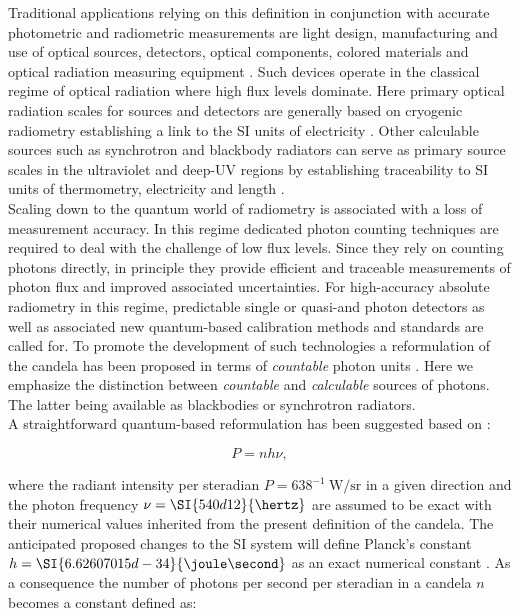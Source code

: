 		Traditional applications relying on this definition in conjunction with accurate photometric and radiometric measurements are light design, manufacturing and use of optical sources, detectors, optical components, colored materials and optical radiation measuring equipment \cite{zwinkels2010photometry}.
		Such devices operate in the classical regime of optical radiation where high flux levels dominate. Here primary optical radiation scales for sources and detectors are generally based on cryogenic radiometry establishing a link to the SI units of electricity \cite{fox20052}. Other calculable sources such as synchrotron and blackbody radiators can serve as primary source scales in the ultraviolet and deep-UV regions by establishing traceability to SI units of thermometry, electricity and length \cite{zwinkels2010photometry, Cheung2007}.
		\\
		Scaling down to the quantum world of radiometry is associated with a loss of measurement accuracy. In this regime dedicated photon counting techniques are required to deal with the challenge of low flux levels. Since they rely on counting photons directly, in principle they provide efficient and traceable measurements of photon flux and improved associated uncertainties. For high-accuracy absolute radiometry in this regime, predictable single or quasi-\spss and photon detectors as well as associated new quantum-based calibration methods and standards are called for. To promote the development of such technologies a reformulation of the candela has been proposed in terms of \emph{countable} photon units \cite{zwinkels2010photometry, Cheung2007, SIHighlights2017, QuCandelaProject}. Here we emphasize the distinction between \emph{countable} and \emph{calculable} sources of photons. The latter being available as blackbodies or synchrotron radiators.
		\\
		A straightforward quantum-based reformulation has been suggested based on \cite{Cheung2007, zwinkels2010photometry}:

		\begin{equation}
			P = n h \nu,
		\end{equation}

		where the radiant intensity per steradian $P = 638^{-1} \SI{}{\watt\per\steradian}$ in a given direction and the photon frequency $\nu = \SI{540d12}{\hertz}$ are assumed to be exact with their numerical values inherited from the present definition of the candela. The anticipated proposed changes to the SI system will define Planck's constant $h = \SI{6.62607015d-34}{\joule\second}$ as an exact numerical constant \cite{SIproposal}. As a consequence the number of photons per second per steradian in a candela $n$ becomes a constant defined as:

